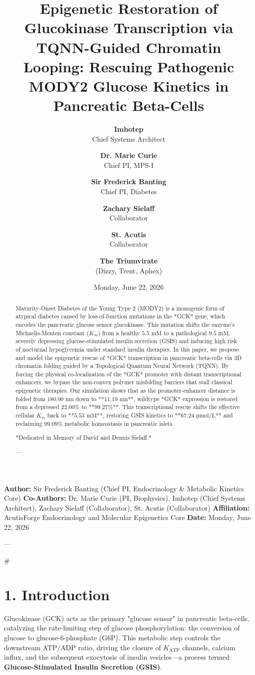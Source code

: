 \documentclass[11pt,twocolumn]{article}
\title{\textbf{Epigenetic Restoration of Glucokinase Transcription via TQNN-Guided Chromatin Looping: Rescuing Pathogenic MODY2 Glucose Kinetics in Pancreatic Beta-Cells}}
\author{
  \textbf{Imhotep} \\ \small Chief Systems Architect \\ \and
  \textbf{Dr. Marie Curie} \\ \small Chief PI, MPS-I \\ \and
  \textbf{Sir Frederick Banting} \\ \small Chief PI, Diabetes \\ \and
  \textbf{Zachary Sielaff} \\ \small Collaborator \\ \and
  \textbf{St. Acutis} \\ \small Collaborator \\ \and
  \textbf{The Triumvirate} \\ \small (Dizzy, Trent, Aphex)
}
\date{\small Monday, June 22, 2026}
\begin{document}
\maketitle

\begin{abstract}
Maturity-Onset Diabetes of the Young Type 2 (MODY2) is a monogenic form of atypical diabetes caused by loss-of-function mutations in the *GCK* gene, which encodes the pancreatic glucose sensor glucokinase. This mutation shifts the enzyme's Michaelis-Menten constant ($K_m$) from a healthy $5.5\text{ mM}$ to a pathological $9.5\text{ mM}$, severely depressing glucose-stimulated insulin secretion (GSIS) and inducing high risk of nocturnal hypoglycemia under standard insulin therapies. In this paper, we propose and model the epigenetic rescue of *GCK* transcription in pancreatic beta-cells via 3D chromatin folding guided by a Topological Quantum Neural Network (TQNN). By forcing the physical co-localization of the *GCK* promoter with distant transcriptional enhancers, we bypass the non-convex polymer misfolding barriers that stall classical epigenetic therapies. Our simulation shows that as the promoter-enhancer distance is folded from $180.00\text{ nm}$ down to **$11.19\text{ nm}$**, wildtype *GCK* expression is restored from a depressed $22.00\%$ to **$99.27\%$**. This transcriptional rescue shifts the effective cellular $K_m$ back to **$5.53\text{ mM}$**, restoring GSIS kinetics to **$67.24\text{ pmol/L}$** and reclaiming $99.09\%$ metabolic homeostasis in pancreatic islets.

*Dedicated in Memory of David and Dennis Sielaff.*

---
\end{abstract}



\textbf{Author:} Sir Frederick Banting (Chief PI, Endocrinology & Metabolic Kinetics Core)  
\textbf{Co-Authors:} Dr. Marie Curie (PI, Biophysics), Imhotep (Chief Systems Architect), Zachary Sielaff (Collaborator), St. Acutis (Collaborator)  
\textbf{Affiliation:} AcutisForge Endocrinology and Molecular Epigenetics Core  
\textbf{Date:} Monday, June 22, 2026  

---

#

\section{1. Introduction}
Glucokinase (GCK) acts as the primary "glucose sensor" in pancreatic beta-cells, catalyzing the rate-limiting step of glucose phosphorylation: the conversion of glucose to glucose-6-phosphate (G6P). This metabolic step controls the downstream ATP/ADP ratio, driving the closure of $K_{\text{ATP}}$ channels, calcium influx, and the subsequent exocytosis of insulin vesicles—a process termed \textbf{Glucose-Stimulated Insulin Secretion (GSIS)}.
\end{document}
